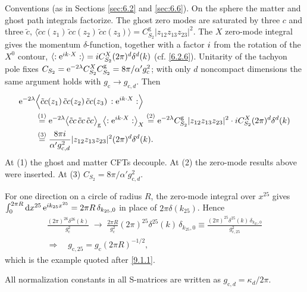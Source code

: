 \begin{tcolorbox}[breakable]
	\begin{remark}
		Conventions (as in Sections \ref{sec:6.2} and \ref{sec:6.6}). On the sphere the matter and ghost path integrals factorize. The ghost zero modes are saturated by three $c$ and three $\tilde c$, $\langle \tilde c c(z_1)\,\tilde c c(z_2)\,\tilde c c(z_3)\rangle = C^{\mathrm{g}}_{S_2}|z_{12}z_{13}z_{23}|^2$. The $X$ zero-mode integral gives the momentum $\delta$-function, together with a factor $i$ from the rotation of the $X^0$ contour, $\langle :\mathrm{e}^{i k\cdot X}:\rangle = i C^{X}_{S_2}(2\pi)^d\delta^d(k)$ (cf. \eqref{6.2.6}). Unitarity of the tachyon pole fixes $C_{S_2}=\mathrm{e}^{-2\lambda}C^X_{S_2}C^{\mathrm{g}}_{S_2}=8\pi/\alpha' g_{\mathrm{c}}^2$; with only $d$ noncompact dimensions the same argument holds with $g_{\mathrm{c}}\to g_{\mathrm{c},d}$. Then
		\begin{align*}
			&\mathrm{e}^{-2\lambda}\Bigl\langle \tilde c c(z_1)\,\tilde c c(z_2)\,\tilde c c(z_3)\,:\mathrm{e}^{i k\cdot X}:\Bigr\rangle\\
			&\qquad\overset{(1)}{=} \mathrm{e}^{-2\lambda}\bigl\langle \tilde c c\,\tilde c c\,\tilde c c\bigr\rangle_{\mathrm{g}}\,\bigl\langle :\mathrm{e}^{i k\cdot X}:\bigr\rangle_X
			\overset{(2)}{=} \mathrm{e}^{-2\lambda}C^{\mathrm{g}}_{S_2}|z_{12}z_{13}z_{23}|^2\cdot i C^X_{S_2}(2\pi)^d\delta^d(k)\\
			&\qquad\overset{(3)}{=} \frac{8\pi i}{\alpha' g_{\mathrm{c},d}^2}|z_{12}z_{13}z_{23}|^2(2\pi)^d\delta^d(k) .
		\end{align*}
		At (1) the ghost and matter CFTs decouple. At (2) the zero-mode results above were inserted. At (3) $C_{S_2}=8\pi/\alpha' g^2_{\mathrm{c},d}$.

		For one direction on a circle of radius $R$, the zero-mode integral over $x^{25}$ gives $\int_0^{2\pi R}\mathrm{d} x^{25}\,\mathrm{e}^{i k_{25}x^{25}}=2\pi R\,\delta_{k_{25},0}$ in place of $2\pi\delta(k_{25})$. Hence
		\begin{gather*}
			\frac{(2\pi)^{26}\delta^{26}(k)}{g_{\mathrm{c}}^2}\;\longrightarrow\;\frac{2\pi R}{g_{\mathrm{c}}^2}(2\pi)^{25}\delta^{25}(k)\,\delta_{k_{25},0}
			\equiv\frac{(2\pi)^{25}\delta^{25}(k)\,\delta_{k_{25},0}}{g_{\mathrm{c},25}^2}\\
			\Longrightarrow\quad \boxed{g_{\mathrm{c},25}=g_{\mathrm{c}}(2\pi R)^{-1/2}} ,
		\end{gather*}
		which is the example quoted after \eqref{9.1.1}.
	\end{remark}
\end{tcolorbox}
All normalization constants in all S-matrices are written as $g_{\mathrm{c}, d}=\kappa_{d} / 2 \pi$.

